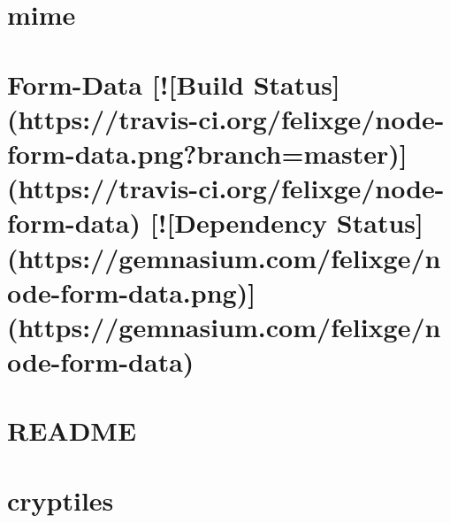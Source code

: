 \documentclass[twoside]{book}
\newcommand{\+}{\discretionary{\mbox{\scriptsize$\hookleftarrow$}}{}{}}
\begin{document}
\chapter{mime}
\label{md__c_1__users_martin__documents__git_hub_visual_studio__bachelor__wis_r__wis_r_node_modules_grud10bb6007f9e371e6a238af149e171f4}
\hypertarget{md__c_1__users_martin__documents__git_hub_visual_studio__bachelor__wis_r__wis_r_node_modules_grud10bb6007f9e371e6a238af149e171f4}{}

\chapter{Form-\/\+Data \mbox{[}!\mbox{[}Build Status\mbox{]}(https\+://travis-\/ci.org/felixge/node-\/form-\/data.png?branch=master)\mbox{]}(https\+://travis-\/ci.org/felixge/node-\/form-\/data) \mbox{[}!\mbox{[}Dependency Status\mbox{]}(https\+://gemnasium.com/felixge/node-\/form-\/data.png)\mbox{]}(https\+://gemnasium.com/felixge/node-\/form-\/data)}
\label{md__c_1__users_martin__documents__git_hub_visual_studio__bachelor__wis_r__wis_r_node_modules_gru0a77566d482a3df0c1030faa63efa5ff}
\hypertarget{md__c_1__users_martin__documents__git_hub_visual_studio__bachelor__wis_r__wis_r_node_modules_gru0a77566d482a3df0c1030faa63efa5ff}{}

\chapter{R\+E\+A\+D\+M\+E}
\label{md__c_1__users_martin__documents__git_hub_visual_studio__bachelor__wis_r__wis_r_node_modules_gru55f86dbc1a3c1faa7ebcb276960b8c7f}
\hypertarget{md__c_1__users_martin__documents__git_hub_visual_studio__bachelor__wis_r__wis_r_node_modules_gru55f86dbc1a3c1faa7ebcb276960b8c7f}{}

\chapter{cryptiles}
\label{md__c_1__users_martin__documents__git_hub_visual_studio__bachelor__wis_r__wis_r_node_modules_grudd69676369e3c3a45dfab2e92b30acb6}
\hypertarget{md__c_1__users_martin__documents__git_hub_visual_studio__bachelor__wis_r__wis_r_node_modules_grudd69676369e3c3a45dfab2e92b30acb6}{}

\end{document}
